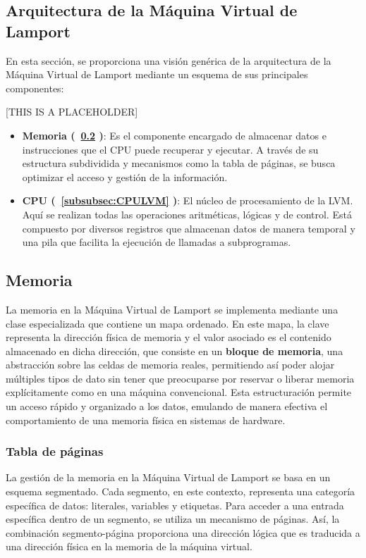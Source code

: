 \subsection{Arquitectura de la Máquina Virtual de Lamport}\label{subsec:archLVM}
En esta sección, se proporciona una visión genérica de la arquitectura de la Máquina Virtual de Lamport mediante un esquema de sus principales componentes:

[THIS IS A PLACEHOLDER]

\begin{itemize}
    \item \textbf{Memoria (~\ref{subsec:memoryLVM} )}: Es el componente encargado de almacenar datos e instrucciones que el CPU puede recuperar y ejecutar. A través de su estructura subdividida y mecanismos como la tabla de páginas, se busca optimizar el acceso y gestión de la información.
    
    \item \textbf{CPU (~\ref{subsubsec:CPULVM} )}: El núcleo de procesamiento de la LVM. Aquí se realizan todas las operaciones aritméticas, lógicas y de control. Está compuesto por diversos registros que almacenan datos de manera temporal y una pila que facilita la ejecución de llamadas a subprogramas.
\end{itemize}

\subsection{Memoria}\label{subsec:memoryLVM}
La memoria en la Máquina Virtual de Lamport se implementa mediante una clase especializada que contiene un mapa ordenado. En este mapa, la clave representa la dirección física de memoria y el valor asociado es el contenido almacenado en dicha dirección, que consiste en un \textbf{bloque de memoria}, una abstracción sobre las celdas de memoria reales, permitiendo así poder alojar múltiples tipos de dato sin tener que preocuparse por reservar o liberar memoria explícitamente como en una máquina convencional. Esta estructuración permite un acceso rápido y organizado a los datos, emulando de manera efectiva el comportamiento de una memoria física en sistemas de hardware.

\subsubsection{Tabla de páginas}\label{subsubsec:pageTableLVM}
La gestión de la memoria en la Máquina Virtual de Lamport se basa en un esquema segmentado. Cada segmento, en este contexto, representa una categoría específica de datos: literales, variables y etiquetas. Para acceder a una entrada específica dentro de un segmento, se utiliza un mecanismo de páginas. Así, la combinación segmento-página proporciona una dirección lógica que es traducida a una dirección física en la memoria de la máquina virtual.

